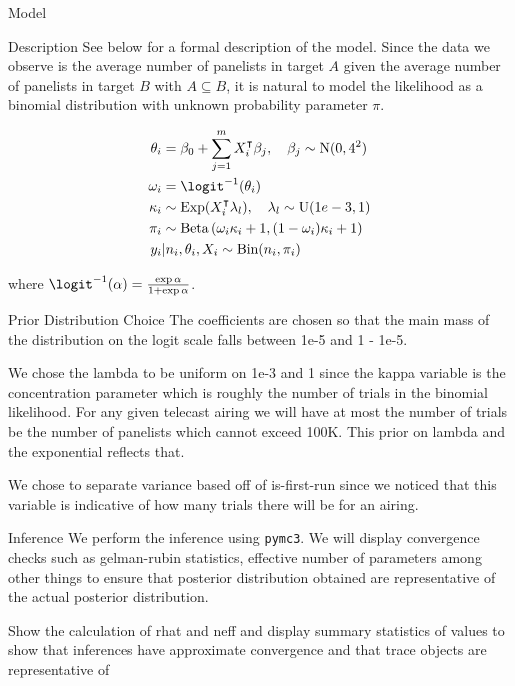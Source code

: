 \begin{chapter}{Model}
\begin{section}{Description}
  See below for a formal description of the model. Since the data we observe is
  the average number of panelists in target $A$ given the average number of panelists in target $B$ with $A \subseteq B$,
  it is natural to model the likelihood as a binomial distribution with unknown probability parameter $\pi$.

  \begin{align*}
    \theta_i &= \beta_0 + \sum_{j=1}^m X_i^\intercal \beta_j, \quad \beta_j \sim \text{N}(0, 4^2) \\
    \omega_i &= \logit^{-1}(\theta_i) \\
    \kappa_i &\sim \text{Exp}(X_i ^\intercal \lambda_l ), \quad \lambda_l \sim \text{U}(1e-3, 1)\\
    \pi_i &\sim \text{Beta}\left(\omega_i \kappa_i + 1, (1 - \omega_i) \kappa_i + 1\right) \\
    y_i &| n_i, \theta_i, X_i \sim \text{Bin}(n_i, \pi_i)
  \end{align*}

  where $\logit^{-1}(\alpha) = \frac{\exp{\alpha}}{1 + \exp{\alpha}}$.
\end{section}

\begin{section}{Prior Distribution Choice}
  The coefficients are chosen so that the main mass of the distribution on the logit scale falls between 1e-5 and 1 - 1e-5.

  We chose the lambda to be uniform on 1e-3 and 1 since the kappa variable is the concentration
  parameter which is roughly the number of trials in the binomial likelihood.
  For any given telecast airing we will have at most the number of trials be
  the number of panelists which cannot exceed 100K. This prior on lambda and
  the exponential reflects that.

  We chose to separate variance based off of is-first-run since we noticed
  that this variable is indicative of how many trials there will be for an airing.
\end{section}

\begin{section}{Inference}
  We perform the inference using \texttt{pymc3}. We will display convergence checks
  such as gelman-rubin statistics, effective number of parameters among other things
  to ensure that posterior distribution obtained are representative of the actual
  posterior distribution.

  Show the calculation of rhat and neff and display summary statistics of values to
  show that inferences have approximate convergence and that trace objects are representative
  of
\end{section}


\end{chapter}
